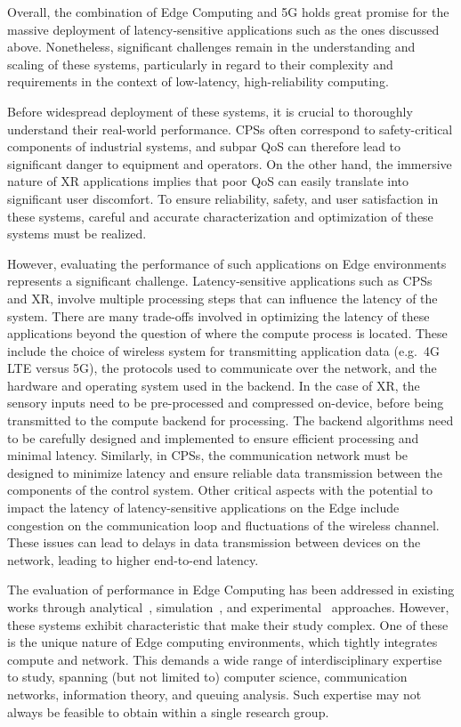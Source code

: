 Overall, the combination of Edge Computing and 5G holds great promise for the massive deployment of latency-sensitive applications such as the ones discussed above.
Nonetheless, significant challenges remain in the understanding and scaling of these systems, particularly in regard to their complexity and requirements in the context of low-latency, high-reliability computing.

Before widespread deployment of these systems, it is crucial to thoroughly understand their real-world performance.
\glspl{CPS} often correspond to safety-critical components of industrial systems, and subpar \gls{QoS} can therefore lead to significant danger to equipment and operators.
On the other hand, the immersive nature of \gls{XR} applications implies that poor \gls{QoS} can easily translate into significant user discomfort.
To ensure reliability, safety, and user satisfaction in these systems, careful and accurate characterization and optimization of these systems must be realized.

However, evaluating the performance of such applications on Edge environments represents a significant challenge.
Latency-sensitive applications such as \glspl{CPS} and \gls{XR}, involve multiple processing steps that can influence the latency of the system.
There are many trade-offs involved in optimizing the latency of these applications beyond the question of where the compute process is located. 
These include the choice of wireless system for transmitting application data (e.g.\ 4G \gls{LTE} versus 5G), the protocols used to communicate over the network, and the hardware and operating system used in the backend.
In the case of \gls{XR}, the sensory inputs need to be pre-processed and compressed on-device, before being transmitted to the compute backend for processing.
The backend algorithms need to be carefully designed and implemented to ensure efficient processing and minimal latency. 
Similarly, in \glspl{CPS}, the communication network must be designed to minimize latency and ensure reliable data transmission between the components of the control system.
Other critical aspects with the potential to impact the latency of latency-sensitive applications on the Edge include congestion on the communication loop and fluctuations of the wireless channel.
These issues can lead to delays in data transmission between devices on the network, leading to higher end-to-end latency.

The evaluation of performance in Edge Computing has been addressed in existing works through analytical~\cite{chen2015efficient,champati2015one,champati2016semi,al2017reliable}, simulation~\cite{svorobej2019simulating,gupta2017ifogsim,sonmez2018edgecloudsim,qayyum2018fognetsimpp}, and experimental~\cite{das2018edgebench,lee2019iotbench,george2020openrtist,mcchesney2019defog,baurle2022comb} approaches.
However, these systems exhibit characteristic that make their study complex.
One of these is the unique nature of Edge computing environments, which tightly integrates compute and network.
This demands a wide range of interdisciplinary expertise to study, spanning (but not limited to) computer science, communication networks, information theory, and queuing analysis.
Such expertise may not always be feasible to obtain within a single research group.

